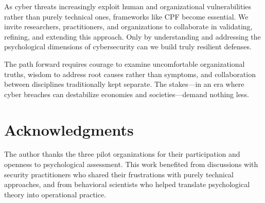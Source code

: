 \documentclass[11pt,a4paper]{article}
\begin{document}
As cyber threats increasingly exploit human and organizational vulnerabilities rather than purely technical ones, frameworks like CPF become essential. We invite researchers, practitioners, and organizations to collaborate in validating, refining, and extending this approach. Only by understanding and addressing the psychological dimensions of cybersecurity can we build truly resilient defenses.

The path forward requires courage to examine uncomfortable organizational truths, wisdom to address root causes rather than symptoms, and collaboration between disciplines traditionally kept separate. The stakes—in an era where cyber breaches can destabilize economies and societies—demand nothing less.

\section*{Acknowledgments}

The author thanks the three pilot organizations for their participation and openness to psychological assessment. This work benefited from discussions with security practitioners who shared their frustrations with purely technical approaches, and from behavioral scientists who helped translate psychological theory into operational practice.
\end{document}
